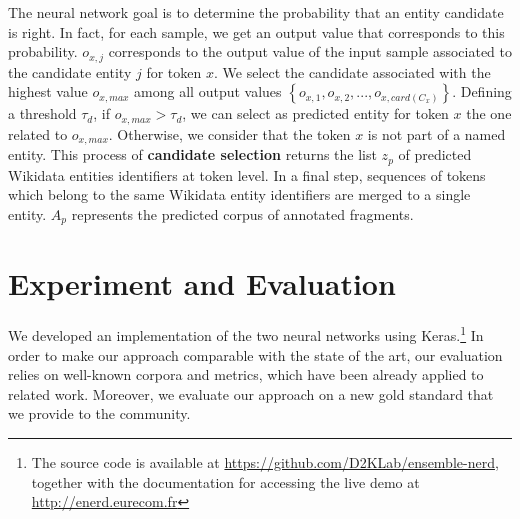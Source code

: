 \documentclass{llncs}
\begin{document}
The neural network goal is to determine the probability that an entity candidate is right. In fact, for each sample, we get an output value that corresponds to this probability.
$o_{x,j}$ corresponds to the output value of the input sample associated to the candidate entity $j$ for token $x$. 
We select the candidate associated with the highest value $o_{x,max}$ among all output values $\left \{  o_{x,1},o_{x,2},...,o_{x,card(C_x)} \right \}$. Defining a threshold $\tau_d$, if $o_{x,max} > \tau_d$, we can select as predicted entity for token $x$ the one related to $o_{x,max}$. Otherwise, we consider that the token $x$ is not part of a named entity. This process of \textbf{candidate selection} returns the list $z_{p}$ of predicted Wikidata entities identifiers at token level. In a final step, sequences of tokens which belong to the same Wikidata entity identifiers are merged to a single entity. $A_{p}$ represents the predicted corpus of annotated fragments. 


\section{Experiment and Evaluation}
\label{sec:evaluation}
We developed an implementation of the two neural networks using Keras.\footnote{The source code is available at \url{https://github.com/D2KLab/ensemble-nerd}, together with the documentation for accessing the live demo at \url{http://enerd.eurecom.fr}}
In order to make our approach comparable with the state of the art, our evaluation relies on well-known corpora and metrics, which have been already applied to related work. Moreover, we evaluate our approach on a new gold standard that we provide to the community.
\end{document}
